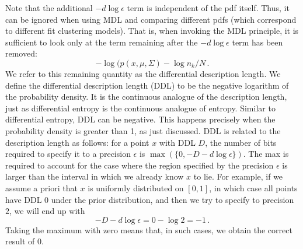 \documentclass[a4paper,fleqn]{cas-sc}
\theoremstyle{remark}
\begin{document}
Note that the additional $-d\log{\epsilon}$ term is independent of the pdf itself. Thus, it can be ignored when using MDL and comparing different pdfs (which correspond to different fit clustering models). That is, when invoking the MDL principle, it is sufficient to look only at the term remaining after the $-d\log{\epsilon}$ term has been removed:
\begin{equation} \label{eq:MVN-DDL}
    -\log(p(x, \mu, \Sigma) - \log n_k/N \,.
\end{equation}
We refer to this remaining quantity as the differential description length. We define the differential description length (DDL) to be the negative logarithm of the probability density. It is the continuous analogue of the description length, just as differential entropy is the continuous analogue of entropy. Similar to differential entropy, DDL can be negative. This happens precisely when the probability density is greater than 1, as just discussed. DDL is related to the description length as follows: for a point $x$ with DDL $D$, the number of bits required to specify it to a precision $\epsilon$ is $\max(\{0,-D - d\log{\epsilon\}})$. 
The max is required to account for the case where the region specified by the precision $\epsilon$ is larger than the interval in which we already know $x$ to lie. For example, if we assume a priori that $x$ is uniformly distributed on $[0,1]$, in which case all points have DDL $0$ under the prior distribution, and then we try to specify to precision $2$, we will end up with 
\[
-D - d\log{\epsilon} = 0 - \log{2} = -1 \,.
\]
Taking the maximum with zero means that, in such cases, we obtain the correct result of $0$.
\end{document}
